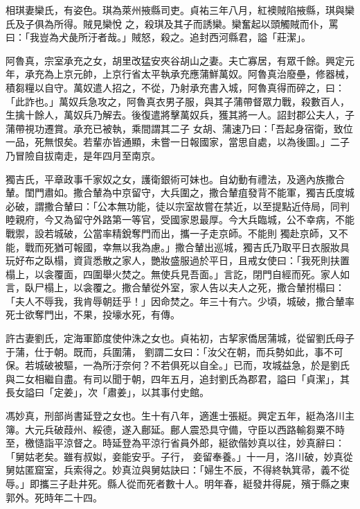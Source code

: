 \begin{pinyinscope}
 相琪妻欒氏，有姿色。琪為萊州掖縣司吏。貞祐三年八月，紅襖賊陷掖縣，琪與欒氏及子俱為所得。賊見欒悅
 之，殺琪及其子而誘欒。欒奮起以頭觸賊而仆，罵曰：「我豈為犬彘所汙者哉。」賊怒，殺之。追封西河縣君，謚「莊潔」。



 阿魯真，宗室承充之女，胡里改猛安夾谷胡山之妻。夫亡寡居，有眾千餘。興定元年，承充為上京元帥，上京行省太平執承充應蒲鮮萬奴。阿魯真治廢壘，修器械，積芻糧以自守。萬奴遣人招之，不從，乃射承充書入城，阿魯真得而碎之，曰：「此詐也。」萬奴兵急攻之，阿魯真衣男子服，與其子蒲帶督眾力戰，殺數百人，生擒十餘人，萬奴兵乃解去。後復遣將擊萬奴兵，獲其將一人。詔封郡公夫人，子蒲帶視功遷賞。承充已被執，乘間謂其二子
 女胡、蒲速乃曰：「吾起身宿衛，致位一品，死無恨矣。若輩亦皆通顯，未嘗一日報國家，當思自處，以為後圖。」二子乃冒險自拔南走，是年四月至南京。



 獨吉氏，平章政事千家奴之女，護衛銀術可妹也。自幼動有禮法，及適內族撒合輦。閨門肅如。撒合輦為中京留守，大兵圍之，撒合輦疽發背不能軍，獨吉氏度城必破，謂撒合輦曰：「公本無功能，徒以宗室故嘗在禁近，以至提點近侍局，同判睦親府，今又為留守外路第一等官，受國家恩最厚。今大兵臨城，公不幸病，不能戰禦，設若城破，公當率精銳奪門而出，攜一子走京師。不能則
 獨赴京師，又不能，戰而死猶可報國，幸無以我為慮。」撒合輦出巡城，獨吉氏乃取平日衣服妝具玩好布之臥榻，資貨悉散之家人，艷妝盛服過於平日，且戒女使曰：「我死則扶置榻上，以衾覆面，四圍舉火焚之。無使兵見吾面。」言訖，閉門自經而死。家人如言，臥尸榻上，以衾覆之。撒合輦從外室，家人告以夫人之死，撒合輦拊榻曰：「夫人不辱我，我肯辱朝廷乎！」因命焚之。年三十有六。少頃，城破，撒合輦率死士欲奪門出，不果，投壕水死，有傳。



 許古妻劉氏，定海軍節度使仲洙之女也。貞祐初，古挈家僑居蒲城，從留劉氏母子于蒲，仕于朝。既而，兵圍蒲，
 劉謂二女曰：「汝父在朝，而兵勢如此，事不可保。若城破被驅，一為所汙奈何？不若俱死以自全。」已而，攻城益急，於是劉氏與二女相繼自盡。有司以聞于朝，四年五月，追封劉氏為郡君，謚曰「貞潔」，其長女謚曰「定姜」，次「肅姜」，以其事付史館。



 馮妙真，刑部尚書延登之女也。生十有八年，適進士張綎。興定五年，綎為洛川主簿。大元兵破葭州、綏德，遂入鄜延。鄜人震恐具守備，守臣以西路輸芻粟不時至，檄慥詣平涼督之。時延登為平涼行省員外郎，綎欲偕妙真以往，妙真辭曰：「舅姑老矣。雖有叔姒，妾能安乎。子行，
 妾留奉養。」十一月，洛川破，妙真從舅姑匿窟室，兵索得之。妙真泣與舅姑訣曰：「婦生不辰，不得終執箕帚，義不從辱。」即攜三子赴井死。縣人從而死者數十人。明年春，綎發井得屍，殯于縣之東郭外。死時年二十四。




\end{pinyinscope}
